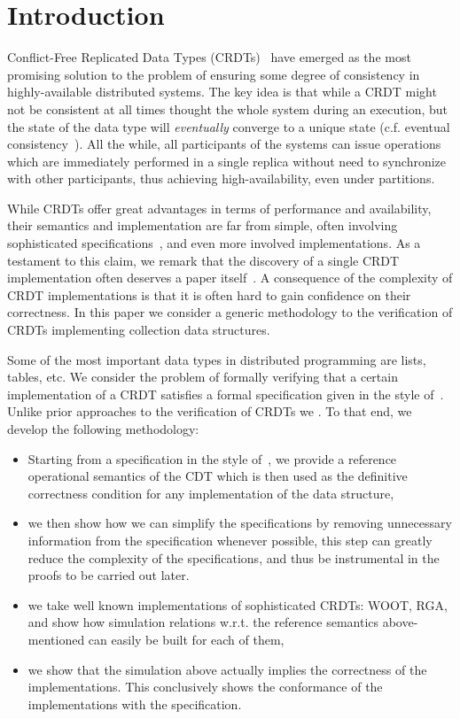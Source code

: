 \section{Introduction}
\label{sec:introduction}

Conflict-Free Replicated Data Types (CRDTs)~\cite{ShapiroPBZ11} have
emerged as the most promising solution to the problem of ensuring
some degree of consistency in highly-available distributed systems.
%
The key idea is that while a CRDT might not be consistent at all times
thought the whole system during an execution, but the state of the
data type will \emph{eventually} converge to a unique state (c.f.
eventual consistency~\cite{Burkhardt}).
%
All the while, all participants of the systems can issue operations
which are immediately performed in a single replica without need to
synchronize with other participants, thus achieving high-availability,
even under partitions.

While CRDTs offer great advantages in terms of performance and
availability, their semantics and implementation are far from simple,
often involving sophisticated specifications~\cite{ShapiroPBZ11,
  Burkhardt}, and even more involved implementations.
%
As a testament to this claim, we remark that the discovery of a single
CRDT implementation often deserves a paper itself~\cite{RAG, WOOT,
  ...}.
%
A consequence of the complexity of CRDT implementations is that it is
often hard to gain confidence on their correctness.
%
In this paper we consider a generic methodology to the verification of
CRDTs implementing collection data structures.

 { 
  Some of the most important data types in
  distributed programming are lists, tables, etc.
}
We consider the problem of formally verifying that a certain
implementation of a CRDT satisfies a formal specification given in the
style of~\cite{Burkhardt}.
%
Unlike prior approaches to the verification of CRDTs we
.
%
To that end, we develop the following methodology:
\begin{itemize}[$\bullet$]
\item Starting from a specification in the style of~\cite{Burkhardt},
  we provide a reference operational semantics of the CDT which is
  then used as the definitive correctness condition for any
  implementation of the data structure, 
\item we then show how we can simplify the specifications by removing
  unnecessary information from the specification whenever possible,
  this step can greatly reduce the complexity of the specifications,
  and thus be instrumental in the proofs to be carried out later. 
\item we take well known implementations of sophisticated CRDTs: WOOT,
  RGA, and show how simulation relations w.r.t. the reference
  semantics above-mentioned can easily be built for each of them, 
\item we show that the simulation above actually implies the
  correctness of the implementations. 
  This conclusively shows the conformance of the implementations with
  the specification. 
\end{itemize}

